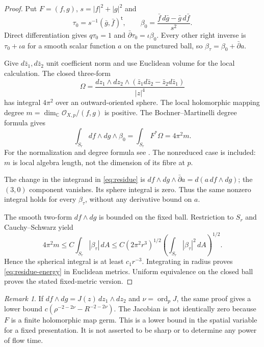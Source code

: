\documentclass[11pt]{amsart}
\theoremstyle{definition}
\theoremstyle{remark}
\newtheorem{remark}[theorem]{Remark}
\newcommand{\CC}{\mathbb C}
\newcommand{\cO}{\mathcal O}
\newcommand{\db}{\bar\partial}
\begin{document}
\begin{proof}
Put $F=(f,g)$, $s=|f|^2+|g|^2$ and
\[
\tau_0=s^{-1}(\bar g,\bar f)^{\mathsf t},\qquad
\beta_0=\frac{\bar f\,d\bar g-\bar g\,d\bar f}{s^2}.
\]
Direct differentiation gives $q\tau_0=1$ and
$\db\tau_0=\iota\beta_0$. Every other right inverse is
$\tau_0+\iota a$ for a smooth scalar function $a$ on the punctured ball,
so $\beta_\tau=\beta_0+\db a$.

Give $d\bar z_1,d\bar z_2$ unit coefficient norm and use Euclidean
volume for the local calculation. The closed three-form
\[
\Omega=\frac{dz_1\wedge dz_2\wedge
(\bar z_1d\bar z_2-\bar z_2d\bar z_1)}{|z|^4}
\]
has integral $4\pi^2$ over an outward-oriented sphere. The local
holomorphic mapping degree $m=\dim_\CC\cO_{X,p}/(f,g)$ is positive.
The Bochner--Martinelli degree formula gives
\begin{equation}\label{eq:residue}
\int_{S_r}df\wedge dg\wedge\beta_0
=\int_{S_r}F^*\Omega=4\pi^2m.
\end{equation}
For the normalization and degree formula see
\cite[Chapter~II, \S5, Example~5.5; Chapter~IV, \S2, Theorems~2.3--2.4]{suwa2005}.
The nonreduced case is included: $m$ is local algebra length, not the
dimension of its fibre at $p$.

The change in the integrand in \eqref{eq:residue} is
$df\wedge dg\wedge\db a=d(a\,df\wedge dg)$; the $(3,0)$ component
vanishes. Its sphere integral is zero. Thus the same nonzero integral
holds for every $\beta_\tau$, without any derivative bound on $a$.

The smooth two-form $df\wedge dg$ is bounded on the fixed ball.
Restriction to $S_r$ and Cauchy--Schwarz yield
\[
4\pi^2m\le C\int_{S_r}|\beta_\tau|\,dA
\le C(2\pi^2r^3)^{1/2}
\left(\int_{S_r}|\beta_\tau|^2\,dA\right)^{1/2}.
\]
Hence the spherical integral is at least $c_1r^{-3}$. Integrating
in radius proves \eqref{eq:residue-energy} in Euclidean metrics. Uniform
equivalence on the closed ball proves the stated fixed-metric version.
\end{proof}

\begin{remark}\label{rem:jacobian}
If $df\wedge dg=J(z)\,dz_1\wedge dz_2$ and
$\nu=\operatorname{ord}_pJ$, the same proof gives a lower bound
$c(\rho^{-2-2\nu}-R^{-2-2\nu})$. The Jacobian is not identically
zero because $F$ is a finite holomorphic map germ. This is a lower
bound in the spatial variable for a fixed presentation. It is not
asserted to be sharp or to determine any power of flow time.
\end{remark}
\end{document}
